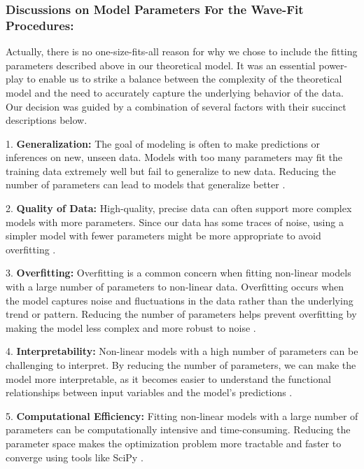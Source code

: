 \documentclass{article}
\begin{document}
\subsubsection{Discussions on Model Parameters For the Wave-Fit Procedures:}

Actually, there is no one-size-fits-all reason for why we chose to include the fitting parameters described above in our theoretical model. It was an essential power-play to enable us to strike a balance between the complexity of the theoretical model and the need to accurately capture the underlying behavior of the data. Our decision was guided by a combination of several factors with their succinct descriptions below.

1. \textbf{Generalization:} The goal of modeling is often to make predictions or inferences on new, unseen data. Models with too many parameters may fit the training data extremely well but fail to generalize to new data. Reducing the number of parameters can lead to models that generalize better \cite{james2013introduction}.

2. \textbf{Quality of Data:} High-quality, precise data can often support more complex models with more parameters. Since our data has some traces of noise, using a simpler model with fewer parameters might be more appropriate to avoid overfitting \cite{bishop2006pattern}.

3. \textbf{Overfitting:} Overfitting is a common concern when fitting non-linear models with a large number of parameters to non-linear data. Overfitting occurs when the model captures noise and fluctuations in the data rather than the underlying trend or pattern. Reducing the number of parameters helps prevent overfitting by making the model less complex and more robust to noise \cite{bishop2006pattern}.

4. \textbf{Interpretability:} Non-linear models with a high number of parameters can be challenging to interpret. By reducing the number of parameters, we can make the model more interpretable, as it becomes easier to understand the functional relationships between input variables and the model's predictions \cite{molnar2020interpretable}.

5. \textbf{Computational Efficiency:} Fitting non-linear models with a large number of parameters can be computationally intensive and time-consuming. Reducing the parameter space makes the optimization problem more tractable and faster to converge using tools like SciPy \cite{nocedal2006numerical}.
\end{document}
